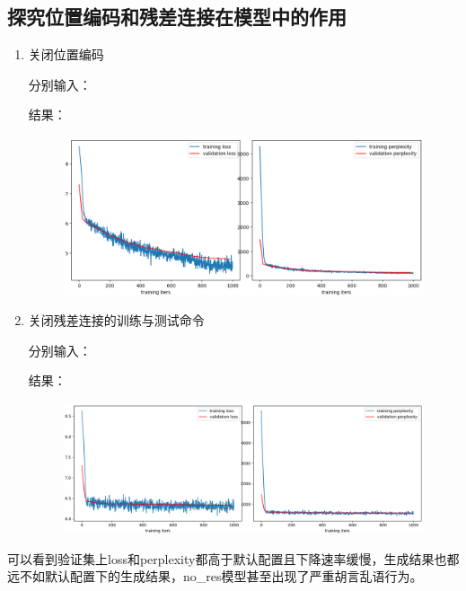 \documentclass[a4paper]{article}
\begin{document}
\subsection{探究位置编码和残差连接在模型中的作用}
\begin{enumerate}
    \item 关闭位置编码
    
    分别输入：
    

    结果：
    \begin{figure}[H]
        \centering
        \includegraphics[width=0.9\linewidth]{../img/2-1.png}
    \end{figure}

    
    
    \item 关闭残差连接的训练与测试命令
    
    分别输入：
    

    结果：
    \begin{figure}[H]
        \centering
        \includegraphics[width=0.9\linewidth]{../img/2-2.png}
    \end{figure}

    
\end{enumerate}

可以看到验证集上loss和perplexity都高于默认配置且下降速率缓慢，生成结果也都远不如默认配置下的生成结果，no\_res模型甚至出现了严重胡言乱语行为。
\end{document}
